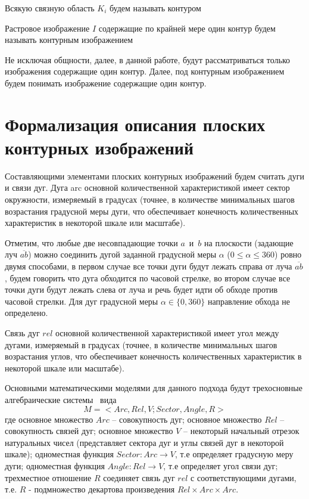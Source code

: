 \begin{definition}
Всякую связную область $K_i$ будем называть контуром
\end{definition}

\begin{definition}
Растровое изображение $I$ содержащие по крайней мере один контур будем называть контурным изображением
\end{definition}

\begin{remark}
Не исключая общности, далее, в данной работе, будут рассматриваться только изображения содержащие один контур. Далее, под контурным изображением будем понимать изображение содержащие один контур.
\end{remark}

\section{Формализация описания плоских контурных изображений}
Составляющими элементами плоских контурных изображений будем считать дуги и связи дуг. Дуга arc основной количественной характеристикой имеет сектор окружности, измеряемый в градусах (точнее, в количестве минимальных шагов возрастания градусной меры дуги, что обеспечивает конечность количественных характеристик в некоторой шкале или масштабе).

Отметим, что любые две несовпадающие точки $a$~и~$b$ на плоскости (задающие луч $\overline{ab}$)
можно соединить дугой заданной градусной меры $\alpha$ ($0\le\alpha\le 360$) ровно двумя способами, в первом
случае все точки дуги будут лежать справа от луча $\overline{ab}$, будем говорить что дуга обходится по часовой стрелке, во втором случае все точки дуги будут лежать слева от луча и речь будет идти об обходе против часовой стрелки. Для дуг градусной меры $\alpha \in \{0,360\}$ направление обхода не определено.

Связь дуг $rel$ основной количественной характеристикой имеет угол между дугами, измеряемый в градусах (точнее, в количестве минимальных шагов возрастания углов, что обеспечивает конечность количественных характеристик в некоторой шкале или масштабе).

Основными математическими моделями для данного подхода будут трехосновные алгебраические системы~\cite{7}\cite{8} вида
\begin{equation}
M = < Arc, Rel, V; Sector, Angle, R >
\end{equation}
где основное множество $Arc$ – совокупность дуг; основное множество $Rel$ – совокупность связей дуг; основное множество $V$ – некоторый начальный отрезок натуральных чисел (представляет сектора дуг и углы связей дуг в некоторой шкале); одноместная функция $Sector: Arc \rightarrow V$, т.е определяет градусную меру дуги; одноместная функция $Angle: Rel \rightarrow V$, т.е определяет угол связи дуг; трехместное отношение $R$ соединяет связь дуг $rel$ с соответствующими дугами, т.е. $R$ - подмножество декартова произведения 
$Rel \times Arc \times Arc.$

